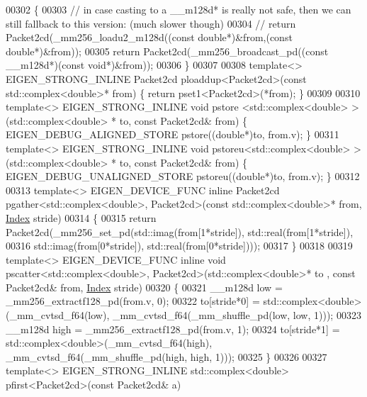 \begin{DoxyCode}
00302 \{
00303   \textcolor{comment}{// in case casting to a \_\_m128d* is really not safe, then we can still fallback to this version: (much
       slower though)}
00304 \textcolor{comment}{//   return Packet2cd(\_mm256\_loadu2\_m128d((const double*)&from,(const double*)&from));}
00305     \textcolor{keywordflow}{return} Packet2cd(\_mm256\_broadcast\_pd((\textcolor{keyword}{const} \_\_m128d*)(\textcolor{keyword}{const} \textcolor{keywordtype}{void}*)&from));
00306 \}
00307 
00308 \textcolor{keyword}{template}<> EIGEN\_STRONG\_INLINE Packet2cd ploaddup<Packet2cd>(\textcolor{keyword}{const} std::complex<double>* from) \{ \textcolor{keywordflow}{return} 
      pset1<Packet2cd>(*from); \}
00309 
00310 \textcolor{keyword}{template}<> EIGEN\_STRONG\_INLINE \textcolor{keywordtype}{void} pstore <std::complex<double> >(std::complex<double> *   to, \textcolor{keyword}{const} 
      Packet2cd& from) \{ EIGEN\_DEBUG\_ALIGNED\_STORE pstore((\textcolor{keywordtype}{double}*)to, from.v); \}
00311 \textcolor{keyword}{template}<> EIGEN\_STRONG\_INLINE \textcolor{keywordtype}{void} pstoreu<std::complex<double> >(std::complex<double> *   to, \textcolor{keyword}{const} 
      Packet2cd& from) \{ EIGEN\_DEBUG\_UNALIGNED\_STORE pstoreu((\textcolor{keywordtype}{double}*)to, from.v); \}
00312 
00313 \textcolor{keyword}{template}<> EIGEN\_DEVICE\_FUNC \textcolor{keyword}{inline} Packet2cd pgather<std::complex<double>, Packet2cd>(\textcolor{keyword}{const} 
      std::complex<double>* from, \hyperlink{namespace_eigen_a62e77e0933482dafde8fe197d9a2cfde}{Index} stride)
00314 \{
00315   \textcolor{keywordflow}{return} Packet2cd(\_mm256\_set\_pd(std::imag(from[1*stride]), std::real(from[1*stride]),
00316                  std::imag(from[0*stride]), std::real(from[0*stride])));
00317 \}
00318 
00319 \textcolor{keyword}{template}<> EIGEN\_DEVICE\_FUNC \textcolor{keyword}{inline} \textcolor{keywordtype}{void} pscatter<std::complex<double>, Packet2cd>(std::complex<double>* to
      , \textcolor{keyword}{const} Packet2cd& from, \hyperlink{namespace_eigen_a62e77e0933482dafde8fe197d9a2cfde}{Index} stride)
00320 \{
00321   \_\_m128d low = \_mm256\_extractf128\_pd(from.v, 0);
00322   to[stride*0] = std::complex<double>(\_mm\_cvtsd\_f64(low), \_mm\_cvtsd\_f64(\_mm\_shuffle\_pd(low, low, 1)));
00323   \_\_m128d high = \_mm256\_extractf128\_pd(from.v, 1);
00324   to[stride*1] = std::complex<double>(\_mm\_cvtsd\_f64(high), \_mm\_cvtsd\_f64(\_mm\_shuffle\_pd(high, high, 1)));
00325 \}
00326 
00327 \textcolor{keyword}{template}<> EIGEN\_STRONG\_INLINE std::complex<double> pfirst<Packet2cd>(\textcolor{keyword}{const} Packet2cd& a)

\end{DoxyCode}
